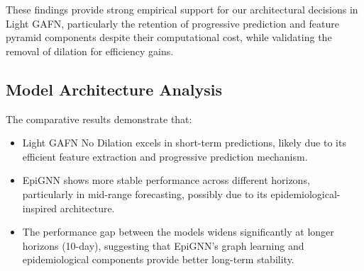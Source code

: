     These findings provide strong empirical support for our architectural decisions in Light GAFN, particularly the retention of progressive prediction and feature pyramid components despite their computational cost, while validating the removal of dilation for efficiency gains.
    
    \subsection{Model Architecture Analysis}
    The comparative results demonstrate that:
    
    \begin{itemize}
        \item Light GAFN No Dilation excels in short-term predictions, likely due to its efficient feature extraction and progressive prediction mechanism.
        
        \item EpiGNN shows more stable performance across different horizons, particularly in mid-range forecasting, possibly due to its epidemiological-inspired architecture.
        
        \item The performance gap between the models widens significantly at longer horizons (10-day), suggesting that EpiGNN's graph learning and epidemiological components provide better long-term stability.
    \end{itemize}